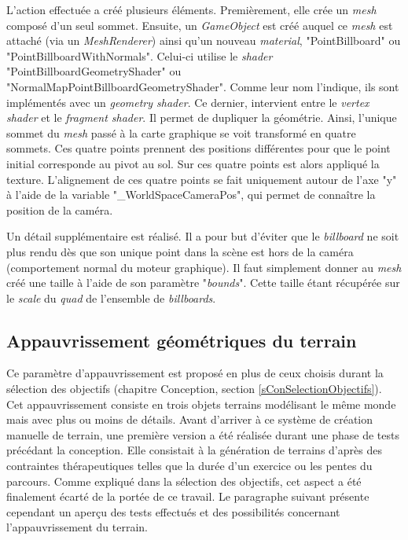 		L'action effectuée a créé plusieurs éléments. Premièrement, elle crée un \textit{mesh} composé d'un seul sommet. Ensuite, un \textit{GameObject} est créé auquel ce \textit{mesh} est attaché (via un \textit{MeshRenderer}) ainsi qu'un nouveau \textit{material}, "PointBillboard" ou "PointBillboardWithNormals". Celui-ci utilise le \textit{shader} "PointBillboardGeometryShader" ou "NormalMapPointBillboardGeometryShader". Comme leur nom l'indique, ils sont implémentés avec un \textit{geometry shader}. Ce dernier, intervient entre le \textit{vertex shader} et le \textit{fragment shader}. Il permet de dupliquer la géométrie. Ainsi, l'unique sommet du \textit{mesh} passé à la carte graphique se voit transformé en quatre sommets. Ces quatre points prennent des positions différentes pour que le point initial corresponde au pivot au sol. Sur ces quatre points est alors appliqué la texture. L'alignement de ces quatre points se fait uniquement autour de l'axe "y" à l'aide de la variable "\_WorldSpaceCameraPos", qui permet de connaître la position de la caméra.
		
		Un détail supplémentaire est réalisé. Il a pour but d'éviter que le \textit{billboard} ne soit plus rendu dès que son unique point dans la scène est hors de la caméra (comportement normal du moteur graphique). Il faut simplement donner au \textit{mesh} créé une taille à l'aide de son paramètre "\textit{bounds}". Cette taille étant récupérée sur le \textit{scale} du \textit{quad} de l'ensemble de \textit{billboards}.
		
	\subsection*{Appauvrissement géométriques du terrain}	
		Ce paramètre d'appauvrissement est proposé en plus de ceux choisis durant la sélection des objectifs (chapitre Conception, section \ref{sConSelectionObjectifs}). Cet appauvrissement consiste en trois objets terrains modélisant le même monde mais avec plus ou moins de détails. Avant d'arriver à ce système de création manuelle de terrain, une première version a été réalisée durant une phase de tests précédant la conception. Elle consistait à la génération de terrains d'après des contraintes thérapeutiques telles que la durée d'un exercice ou les pentes du parcours. Comme expliqué dans la sélection des objectifs, cet aspect a été finalement écarté de la portée de ce travail. Le paragraphe suivant présente cependant un aperçu des tests effectués et des possibilités concernant l'appauvrissement du terrain.
		\\
		
